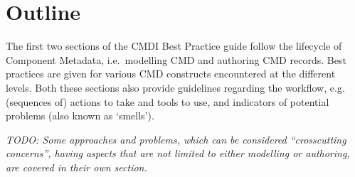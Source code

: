 \section{Outline}\label{outline}

The first two sections of the CMDI Best Practice guide follow the
lifecycle of Component Metadata, i.e.~modelling CMD and authoring CMD
records. Best practices are given for various CMD constructs encountered
at the different levels. Both these sections also provide guidelines
regarding the workflow, e.g. (sequences of) actions to take and tools to
use, and indicators of potential problems (also known as `smells').

\emph{TODO: Some approaches and problems, which can be considered
``crosscutting concerns'', having aspects that are not limited to either
modelling or authoring, are covered in their own section.}
